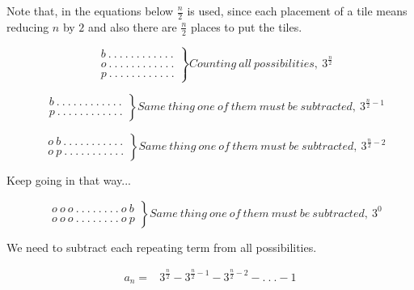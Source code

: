 \documentclass[12pt]{article}
\begin{document}
\begin{enumerate}
\begin{enumerate}
        Note that, in the equations below $\frac{n}{2}$ is used, since each placement of a tile means reducing $n$ by $2$ and also there are $\frac{n}{2}$ places to put the tiles.

\begin{equation*}
  \left.\begin{aligned}
  &b \ . \ . \ . \ . \ . \ . \ . \ . \ . \ . \ . \ . \\
  &o \ . \ . \ . \ . \ . \ . \ . \ . \ . \ . \ . \ .\\
  &p \ . \ . \ . \ . \ . \ . \ . \ . \ . \ . \ . \ .
\end{aligned}\right\} Counting \ all \ possibilities, \ 3^{\frac{n}{2}} 
\end{equation*}

\begin{equation*}
  \left.\begin{aligned}
  &b \ . \ . \ . \ . \ . \ . \ . \ . \ . \ . \ . \ . \\
  &p \ . \ . \ . \ . \ . \ . \ . \ . \ . \ . \ . \ .
\end{aligned}\right\} Same \ thing \ one \ of\ them \ must \ be \ subtracted, \ 3^{\frac{n}{2}-1}
\end{equation*}

\begin{equation*}
  \left.\begin{aligned}
  &o \ b \ . \ . \ . \ . \ . \ . \ . \ . \ . \ . \ . \\
  &o \ p \ . \ . \ . \ . \ . \ . \ . \ . \ . \ . \ .
\end{aligned}\right\} Same \ thing \ one \ of\ them \ must \ be \ subtracted, \ 3^{\frac{n}{2}-2}
\end{equation*}

Keep going in that way...


\begin{equation*}
  \left.\begin{aligned}
  &o \ o \ o \ . \ . \ . \ . \ . \ . \ . \ . \ o \ b \\
  &o \ o \ o \ . \ . \ . \ . \ . \ . \ . \ . \ o \ p
\end{aligned}\right\} Same \ thing \ one \ of\ them \ must \ be \ subtracted, \ 3^{0}
\end{equation*}

We need to subtract each repeating term from all possibilities.

\begin{equation*}
    \begin{split}
        a_n = & 3^{\frac{n}{2}} - 3^{\frac{n}{2}-1} - 3^{\frac{n}{2}-2}-. \ . \ .-1
    \end{split}
\end{equation*}


\end{enumerate}
\end{enumerate}
\end{document}
